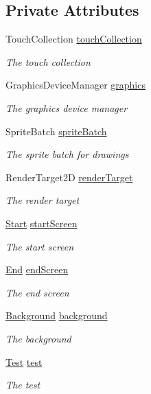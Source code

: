 \subsection*{Private Attributes}
\begin{DoxyCompactItemize}
\item 
Touch\+Collection \hyperlink{classXaria_1_1Game1_a77bc7b728632132aa5b8c6b21a7d693f}{touch\+Collection}
\begin{DoxyCompactList}\small\item\em The touch collection \end{DoxyCompactList}\item 
Graphics\+Device\+Manager \hyperlink{classXaria_1_1Game1_a1bbdbcd137d3484aa8c662c8574ac1a3}{graphics}
\begin{DoxyCompactList}\small\item\em The graphics device manager \end{DoxyCompactList}\item 
Sprite\+Batch \hyperlink{classXaria_1_1Game1_a5c9ecabcaf53ac9aa1a8fd1d18a9e585}{sprite\+Batch}
\begin{DoxyCompactList}\small\item\em The sprite batch for drawings \end{DoxyCompactList}\item 
Render\+Target2D \hyperlink{classXaria_1_1Game1_aa3c7c24833232bb76e3ce661b6e15da3}{render\+Target}
\begin{DoxyCompactList}\small\item\em The render target \end{DoxyCompactList}\item 
\hyperlink{classXaria_1_1Screens_1_1Start}{Start} \hyperlink{classXaria_1_1Game1_a6707e2f65e76cd15207852d0f502f07c}{start\+Screen}
\begin{DoxyCompactList}\small\item\em The start screen \end{DoxyCompactList}\item 
\hyperlink{classXaria_1_1Screens_1_1End}{End} \hyperlink{classXaria_1_1Game1_a24d32974a54581bfc6931f9dd8b3b107}{end\+Screen}
\begin{DoxyCompactList}\small\item\em The end screen \end{DoxyCompactList}\item 
\hyperlink{classXaria_1_1Screens_1_1Background}{Background} \hyperlink{classXaria_1_1Game1_a78d1a6b1749b5d112ca90524a74728ed}{background}
\begin{DoxyCompactList}\small\item\em The background \end{DoxyCompactList}\item 
\hyperlink{classXaria_1_1Test}{Test} \hyperlink{classXaria_1_1Game1_af5b61c7ae01c473704d377da028b39eb}{test}
\begin{DoxyCompactList}\small\item\em The test \end{DoxyCompactList}\end{DoxyCompactItemize}


